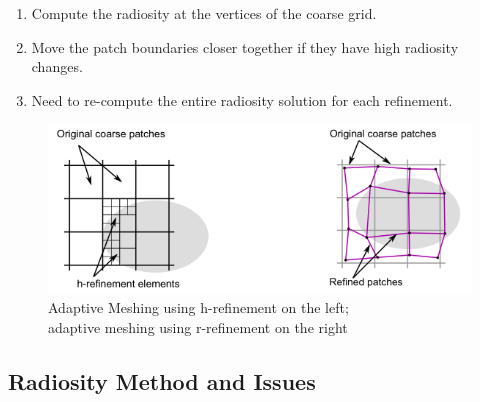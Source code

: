 \documentclass[twocolumn,landscape,10pt]{article}
\theoremstyle{definition}
\begin{document}
\begin{itemize}
        \begin{enumerate}
            \item Compute the radiosity at the vertices of the coarse grid.
            \item Move the patch boundaries closer together if they have high
                radiosity changes.
            \item Need to re-compute the entire radiosity solution for each
                refinement.
        \end{enumerate} 
        \begin{figure}
          	\includegraphics[scale=0.5]{rh-refinement.png}
          	\centering
          	\caption{Adaptive Meshing using h-refinement on the
            left; \\adaptive meshing using r-refinement on the right}
            \label{fig:rh}
        \end{figure}
\end{itemize} 

\subsection{Radiosity Method and Issues}
\end{document}
